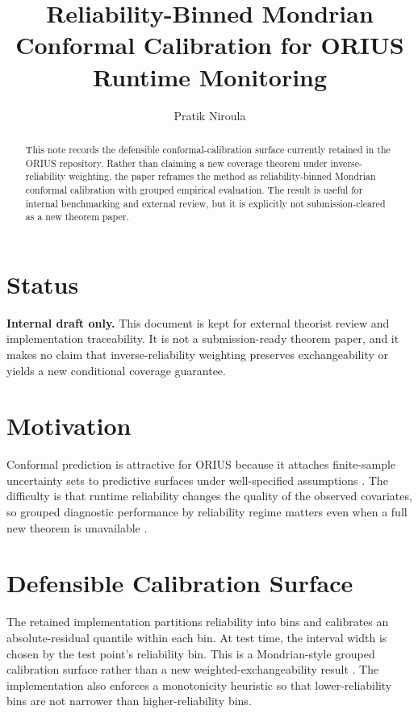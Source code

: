 \documentclass[conference]{IEEEtran}
\title{Reliability-Binned Mondrian Conformal Calibration for ORIUS Runtime Monitoring}
\author{Pratik Niroula}
\begin{document}
\maketitle

\begin{abstract}
This note records the defensible conformal-calibration surface currently retained in the ORIUS repository. Rather than claiming a new coverage theorem under inverse-reliability weighting, the paper reframes the method as reliability-binned Mondrian conformal calibration with grouped empirical evaluation. The result is useful for internal benchmarking and external review, but it is explicitly not submission-cleared as a new theorem paper.
\end{abstract}

\section{Status}
\textbf{Internal draft only.} This document is kept for external theorist review and implementation traceability. It is not a submission-ready theorem paper, and it makes no claim that inverse-reliability weighting preserves exchangeability or yields a new conditional coverage guarantee.

\section{Motivation}
Conformal prediction is attractive for ORIUS because it attaches finite-sample uncertainty sets to predictive surfaces under well-specified assumptions \cite{vovk2005algorithmic,romano2019conformalized,angelopoulos2023gentle}. The difficulty is that runtime reliability changes the quality of the observed covariates, so grouped diagnostic performance by reliability regime matters even when a full new theorem is unavailable \cite{gibbs2021adaptive,barber2023beyond}.

\section{Defensible Calibration Surface}
The retained implementation partitions reliability into bins and calibrates an absolute-residual quantile within each bin. At test time, the interval width is chosen by the test point's reliability bin. This is a Mondrian-style grouped calibration surface rather than a new weighted-exchangeability result \cite{vovk2005algorithmic}. The implementation also enforces a monotonicity heuristic so that lower-reliability bins are not narrower than higher-reliability bins.
\end{document}
